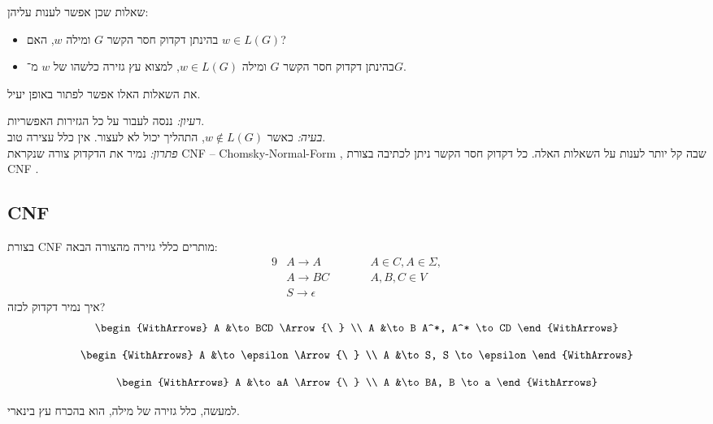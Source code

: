 \documentclass[]{article}
\newcommand\del   {$ \!\! $}
\newcommand\Si    {\Sigma}
\newcommand\epsi  {\epsilon}
\begin{document}
	שאלות שכן אפשר לענות עליהן: 
	\begin{itemize}[-]
		\item בהינתן דקדוק חסר הקשר $G$ ומילה $w$, האם $w \in L(G)$? 
		\item בהינתן דקדוק חסר הקשר $G$ ומילה $w \in L(G)$, למצוא עץ גזירה כלשהו של $w$ מ־$G$. 
	\end{itemize}
	
	את השאלות האלו אפשר לפתור באופן יעיל. 
	
	\textit{רעיון: }ננסה לעבור על כל הגזירות האפשריות. \\
	\textit{בעיה: }כאשר $w \not\in L(G)$, התהליך יכול לא לעצור. אין כלל עצירה טוב. \\
	
	\textit{פתרון: }נמיר את הדקדוק צורה שנקראת CNF – Chomsky-Normal-Form \del, שבה קל יותר לענות על השאלות האלה. כל דקדוק חסר הקשר ניתן לכתיבה בצורת CNF \del. 
	
	\subsection{CNF}
	בצורת CNF מותרים כללי גזירה מהצורה הבאה: 
	\begin{alignat*}{9}
		&A \to A &&\quad\quad A \in C, A \in \Si, \\
		&A \to BC &&\quad\quad A, B, C \in V \\
		&S \to \epsi
	\end{alignat*}
	איך נמיר דקדוק לכזה?
	\[ \begin{WithArrows}
		A &\to BCD \Arrow{\ } \\
		A &\to B A^*, A^* \to CD
	\end{WithArrows} \]
	
	\[ \begin{WithArrows}
		A &\to \epsi \Arrow{\ } \\
		A &\to S, S \to \epsi 
	\end{WithArrows} \]
	
	\[ \begin{WithArrows}
		A &\to aA \Arrow{\ } \\
		A &\to BA, B \to a
	\end{WithArrows} \]
	
	למעשה, כלל גזירה של מילה, הוא בהכרח עץ בינארי. 
	
\end{document}
